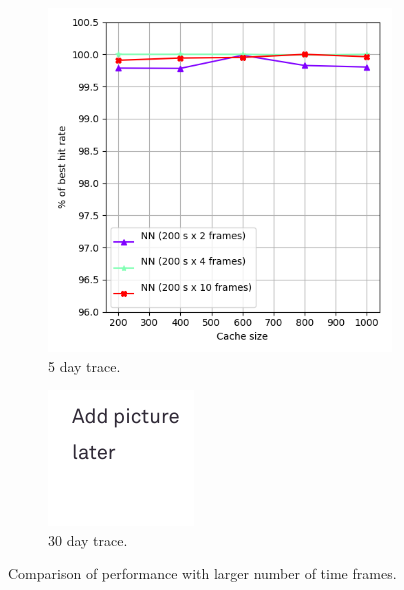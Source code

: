 \begin{figure}[b!]
	\centering
	
	\begin{subfigure}[b]{0.49\linewidth}
		\includegraphics[width=\linewidth]{pics/cache5.png}
		\caption{5 day trace.}
	\end{subfigure}
	\begin{subfigure}[b]{0.49\linewidth}
		\includegraphics[width=\linewidth]{pics/todo.png}
		\caption{30 day trace.}
	\end{subfigure}
	\caption{Comparison of performance with larger number of time frames.}
	\label{fig:cache5}
\end{figure}

